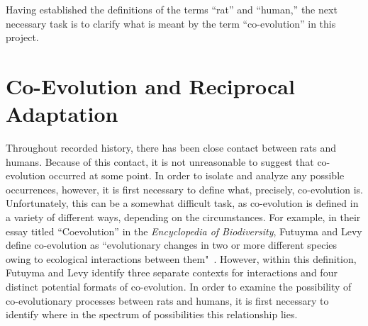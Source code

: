 \documentclass[12pt]{article}
\begin{document}
Having established the definitions of the terms ``rat'' and ``human,'' the next necessary task is to clarify what is meant by the term ``co-evolution'' in this project.

\section{Co-Evolution and Reciprocal Adaptation} \label{Co-Evolution}

Throughout recorded history, there has been close contact between rats and humans. Because of this contact, it is not unreasonable to suggest that co-evolution occurred at some point. In order to isolate and analyze any possible occurrences, however, it is first necessary to define what, precisely, co-evolution is. Unfortunately, this can be a somewhat difficult task, as co-evolution is defined in a variety of different ways, depending on the circumstances. For example, in their essay titled ``Coevolution'' in the \textit{Encyclopedia of Biodiversity}, Futuyma and Levy define co-evolution as ``evolutionary changes in two or more different species owing to ecological interactions between them"~\cite{FutuymaLevy2001}. However, within this definition, Futuyma and Levy identify three separate contexts for interactions and four distinct potential formats of co-evolution. In order to examine the possibility of co-evolutionary processes between rats and humans, it is first necessary to identify where in the spectrum of possibilities this relationship lies.
\end{document}
